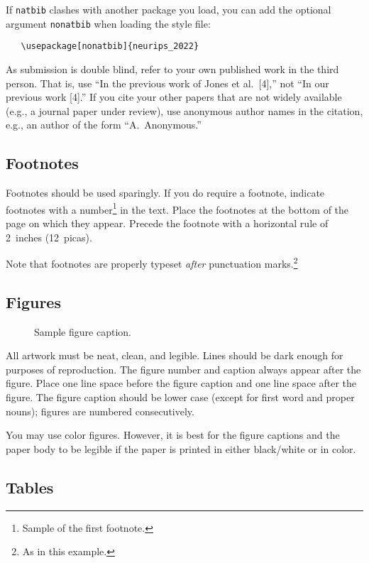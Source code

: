\documentclass{article}
\begin{document}
If \verb+natbib+ clashes with another package you load, you can add the optional
argument \verb+nonatbib+ when loading the style file:
\begin{verbatim}
   \usepackage[nonatbib]{neurips_2022}
\end{verbatim}


As submission is double blind, refer to your own published work in the third
person. That is, use ``In the previous work of Jones et al.\ [4],'' not ``In our
previous work [4].'' If you cite your other papers that are not widely available
(e.g., a journal paper under review), use anonymous author names in the
citation, e.g., an author of the form ``A.\ Anonymous.''


\subsection{Footnotes}


Footnotes should be used sparingly.  If you do require a footnote, indicate
footnotes with a number\footnote{Sample of the first footnote.} in the
text. Place the footnotes at the bottom of the page on which they appear.
Precede the footnote with a horizontal rule of 2~inches (12~picas).


Note that footnotes are properly typeset \emph{after} punctuation
marks.\footnote{As in this example.}


\subsection{Figures}


\begin{figure}
  \centering
  \fbox{\rule[-.5cm]{0cm}{4cm} \rule[-.5cm]{4cm}{0cm}}
  \caption{Sample figure caption.}
\end{figure}


All artwork must be neat, clean, and legible. Lines should be dark enough for
purposes of reproduction. The figure number and caption always appear after the
figure. Place one line space before the figure caption and one line space after
the figure. The figure caption should be lower case (except for first word and
proper nouns); figures are numbered consecutively.


You may use color figures.  However, it is best for the figure captions and the
paper body to be legible if the paper is printed in either black/white or in
color.


\subsection{Tables}
\end{document}
